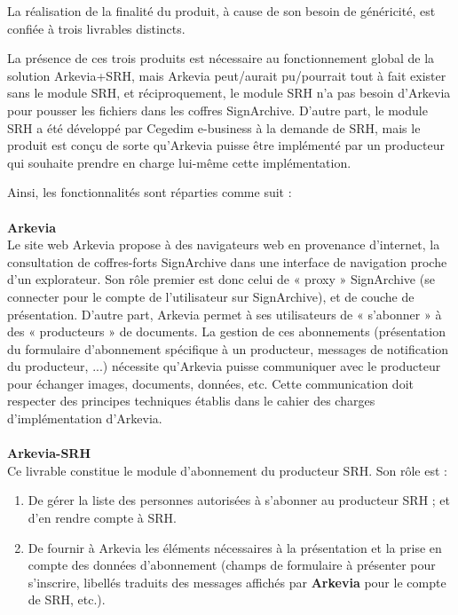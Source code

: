 La réalisation de la finalité du produit, à   cause de son besoin de généricité, est confiée à trois livrables distincts.
\begin{beware}[title=Note : ]
    La présence de ces trois produits est nécessaire au fonctionnement global de la solution Arkevia+SRH, mais Arkevia peut/aurait pu/pourrait tout à fait exister sans le module SRH, et réciproquement, le module SRH n’a pas besoin d’Arkevia pour pousser les fichiers dans les coffres SignArchive. D’autre part, le module SRH a été développé par Cegedim e-business à la demande de SRH, mais le produit est conçu de sorte qu’Arkevia puisse être implémenté par un producteur qui souhaite prendre en charge lui-même cette implémentation.
\end{beware}
\noindent
Ainsi, les fonctionnalités sont réparties comme suit :\\\\
\textbf{Arkevia}\\
Le site web Arkevia  propose à des navigateurs web en provenance d’internet, la consultation de coffres-forts  SignArchive dans  une interface  de navigation  proche d’un explorateur. Son rôle premier est  donc celui  de « proxy » SignArchive (se connecter pour le compte de l’utilisateur sur SignArchive), et de couche de présentation. D’autre part, Arkevia permet à ses utilisateurs de « s’abonner » à des « producteurs » de documents. La gestion de ces abonnements (présentation  du formulaire d’abonnement spécifique à un producteur, messages de notification du  producteur, ...) nécessite qu’Arkevia puisse communiquer avec le producteur pour échanger images, documents, données, etc. Cette communication doit respecter des principes techniques établis dans le cahier des charges d'implémentation d’Arkevia.\\\\
\textbf{Arkevia-SRH}\\
Ce livrable constitue le module d’abonnement du producteur SRH. Son rôle est :
\begin{enumerate}
    \item De gérer la liste des personnes autorisées à s’abonner au producteur SRH ; et d'en rendre compte à SRH.
    \item De fournir à Arkevia les éléments nécessaires à la  présentation  et la  prise en compte des données d’abonnement (champs de formulaire à  présenter pour s'inscrire, libellés traduits des messages affichés par \textbf{Arkevia} pour le compte de SRH, etc.).
\end{enumerate}


